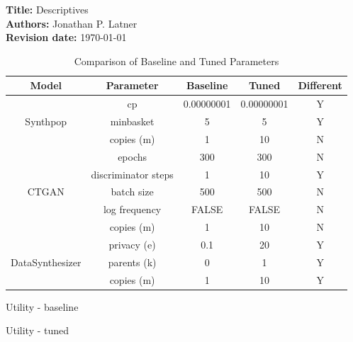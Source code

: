 \documentclass[12pt]{article}
\begin{document}
{\bf Title:} Descriptives \\
{\bf Authors:} Jonathan P. Latner \\
{\bf Revision date:} \today

\begin{table}[htbp]
\centering
\caption{Comparison of Baseline and Tuned Parameters}
\begin{tabular}{|c|c|c|c|c|}
\hline
\textbf{Model} & \textbf{Parameter} & \textbf{Baseline} & \textbf{Tuned} & \textbf{Different} \\ \hline
\multirow{3}{*}{Synthpop}   & cp            & 0.00000001    & 0.00000001 & Y \\                            & minbasket     & 5             & 5         & Y \\ 
                            & copies (m)    & 1             & 10        & N \\ \hline
\multirow{5}{*}{CTGAN}      & epochs            & 300   & 300   & N \\ 
                        & discriminator steps   & 1     & 10    & Y \\ 
                        & batch size            & 500   & 500   & N \\ 
                        & log frequency         & FALSE & FALSE & N \\ 
                        & copies (m)            & 1     & 10    & N \\ \hline
\multirow{4}{*}{DataSynthesizer} & privacy (e)  & 0.1   & 20    & Y  \\ 
                        & parents (k)           & 0     & 1     & Y  \\ 
                        & copies (m)            & 1     & 10    & Y  \\ \hline
\end{tabular}
\end{table}

\begin{table}[!h]
    \caption{Utility - baseline}
    \centering
    \resizebox{.8\textwidth}{!}{}
    \label{table_utility_baseline}
\end{table}

\begin{table}[!h]
    \caption{Utility - tuned}
    \centering
    \resizebox{.8\textwidth}{!}{}
    \label{table_utility_tuned}
\end{table}
\end{document}
